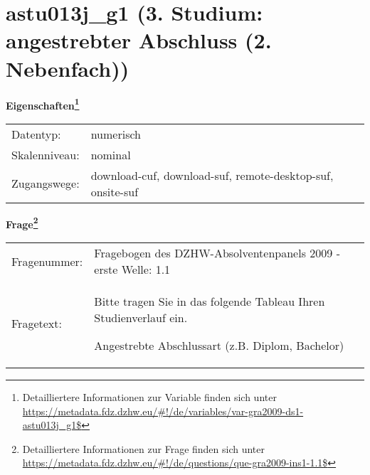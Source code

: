 
    \setcounter{footnote}{0}

    \vspace*{-1.8cm}
	\section{astu013j\_g1 (3. Studium: angestrebter Abschluss (2. Nebenfach))}
	\label{section:astu013j_g1}



    \vspace*{0.5cm}
    \noindent\textbf{Eigenschaften\footnote{Detailliertere Informationen zur Variable finden sich unter
		\url{https://metadata.fdz.dzhw.eu/\#!/de/variables/var-gra2009-ds1-astu013j_g1$}}}\\
	\begin{tabularx}{\hsize}{@{}lX}
	Datentyp: & numerisch \\
	Skalenniveau: & nominal \\
	Zugangswege: &
	  download-cuf, 
	  download-suf, 
	  remote-desktop-suf, 
	  onsite-suf
 \\
    \end{tabularx}



				\vspace*{0.5cm}
                \noindent\textbf{Frage\footnote{Detailliertere Informationen zur Frage finden sich unter
		              \url{https://metadata.fdz.dzhw.eu/\#!/de/questions/que-gra2009-ins1-1.1$}}}\\
				\begin{tabularx}{\hsize}{@{}lX}
					Fragenummer: &
					  Fragebogen des DZHW-Absolventenpanels 2009 - erste Welle:
					  1.1
 \\
					Fragetext: & Bitte tragen Sie in das folgende Tableau Ihren Studienverlauf ein.\par  Angestrebte Abschlussart (z.B. Diplom, Bachelor) \\
				\end{tabularx}






